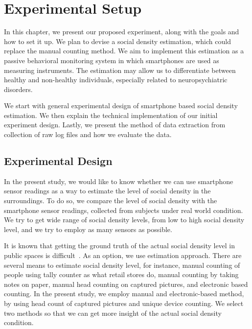 \chapter{Experimental Setup}
\label{ch:experimental-setup} %

In this chapter, we present our proposed experiment, along with the goals and how to set it up. We plan to devise a social density estimation, which could replace the manual counting method. We aim to implement this estimation as a passive behavioral monitoring system in which smartphones are used as measuring instruments. The estimation may allow us to differentiate between healthy and non-healthy individuals, especially related to neuropsychiatric disorders.

We start with general experimental design of smartphone based social density estimation. We then explain the technical implementation of our initial experiment design. Lastly, we present the method of data extraction from collection of raw log files and how we evaluate the data.








\section{Experimental Design} %
\label{sec:experimental_design}
In the present study, we would like to know whether we can use smartphone sensor readings as a way to estimate the level of social density in the surroundings. To do so, we compare the level of social density with the smartphone sensor readings, collected from subjects under real world condition. We try to get wide range of social density levels, from low to high social density level, and we try to employ as many sensors as possible.

It is known that getting the ground truth of the actual social density level in public spaces is difficult~\cite{thesis041}. As an option, we use estimation approach. There are several means to estimate social density level, for instance, manual counting of people using tally counter as what retail stores do, manual counting by taking notes on paper, manual head counting on captured pictures, and electronic based counting. In the present study, we employ manual and electronic-based method, by using head count of captured pictures and unique device counting. We select two methods so that we can get more insight of the actual social density condition.

